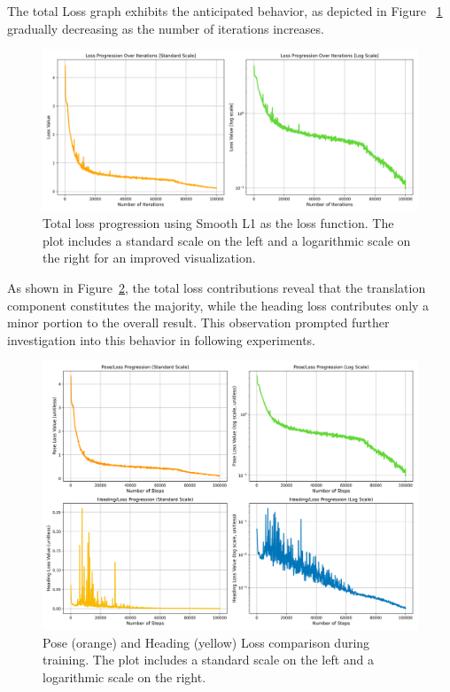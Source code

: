 The total Loss graph exhibits the anticipated behavior, as depicted in Figure ~\ref{fig:smooth-l1-total-loss} gradually decreasing as the number of iterations increases. 
\begin{figure}[H]
    \centering
    \includegraphics[width=1\linewidth]{LateX//figs/loss_total_l1s_progression_comparison.png}
    \caption{Total loss progression using Smooth L1 as the loss function. The plot includes a standard scale on the left and a logarithmic scale on the right for an improved visualization.}
    \label{fig:smooth-l1-total-loss}
\end{figure}

As shown in Figure~\ref{fig:smooth-l1-pose-heading-loss}, the total loss contributions reveal that the translation component constitutes the majority, while the heading loss contributes only a minor portion to the overall result. This observation prompted further investigation into this behavior in following experiments.
\begin{figure}[H]
    \centering
    \includegraphics[width=1\linewidth]{LateX//figs/l1s_pose_heading_loss_comparison.png}
    \caption{Pose (orange) and Heading (yellow) Loss comparison during training. The plot includes a standard scale on the left and a logarithmic scale on the right.}
    \label{fig:smooth-l1-pose-heading-loss}
\end{figure}

